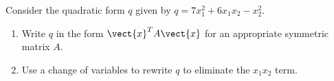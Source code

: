 \begin{ex} Consider the quadratic form $q$ given by $q = 7x_1^2 + 6x_1x_2 - x_2^2$.
\begin{enumerate}
\item Write $q$ in the form $\vect{x}^TA\vect{x}$ for an appropriate symmetric matrix $A$.
\item Use a change of variables to rewrite $q$ to eliminate the $x_1x_2$ term. 
\end{enumerate}
\end{ex}

